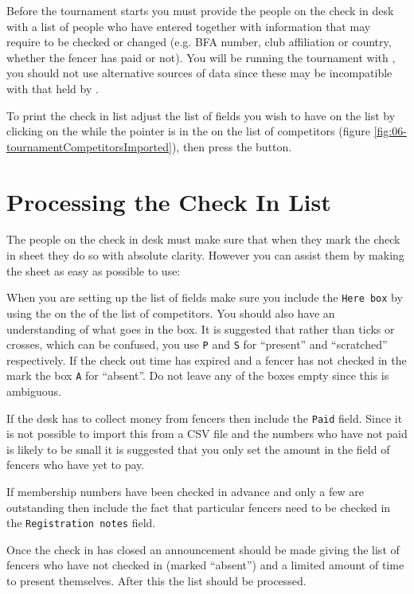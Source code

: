 \documentclass[a4paper,11pt]{memoir}
\begin{document}
Before the tournament starts you must provide the people on the check in desk with a list of people who have entered together with information that may require to be checked or changed (e.g. BFA number, club affiliation or country, whether the fencer has paid or not).
You will be running the tournament with \fencingtime{}, you should not use alternative sources of data since these may be incompatible with that held by \fencingtime{}.

To print the check in list adjust the list of fields you wish to have on the list by clicking on the  while the pointer is in the  on the list of competitors (figure \ref{fig:06-tournamentCompetitorsImported}), then press the  button. 

\section{Processing the Check In List}

The people on the check in desk must make sure that when they mark the check in sheet they do so with absolute clarity. However you can assist them by making the sheet as easy as possible to use:

When you are setting up the list of fields make sure you include the \texttt{Here box} by using the  on the  of the list of competitors. You should also have an understanding of what goes in the box. It is suggested that rather than ticks or crosses, which can be confused, you use \texttt{P} and \texttt{S} for “present” and “scratched” respectively. If the check out time has expired and a fencer has not checked in the mark the box \texttt{A} for “absent”. Do not leave any of the boxes empty since this is ambiguous.

If the desk has to collect money from fencers then include the \texttt{Paid} field. Since it is not possible to import this from a CSV file and the numbers who have not paid is likely to be small it is suggested that you only set the amount in the field of fencers who have yet to pay.

If membership numbers have been checked in advance and only a few are outstanding then include the fact that particular fencers need to be checked in the \texttt{Registration notes} field.

Once the check in has closed an announcement should be made giving the list of fencers who have not checked in (marked “absent”) and a limited amount of time to present themselves. After this the list should be processed. 
\end{document}
